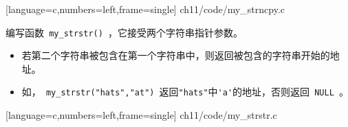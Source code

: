 \begin{frame}

[language=c,numbers=left,frame=single]
{ch11/code/my_strncpy.c}
\end{frame}




\begin{frame}[fragile]
\begin{li} 
编写函数\lstinline| my_strstr() |，它接受两个字符串指针参数。
\begin{itemize}
\item 若第二个字符串被包含在第一个字符串中，则返回被包含的字符串开始的地址。
\item 如，\lstinline| my_strstr("hats","at") |返回\lstinline|"hats"|中\lstinline|'a'|的地址，否则返回\lstinline| NULL |。
\end{itemize}
\end{li}
\end{frame}


\begin{frame}

[language=c,numbers=left,frame=single]
{ch11/code/my_strstr.c}
\end{frame}

